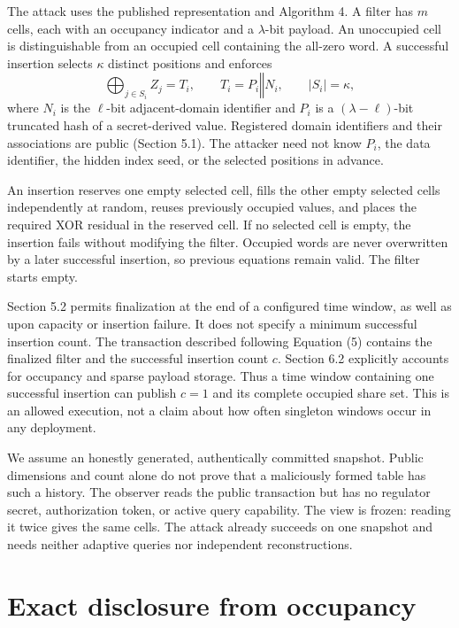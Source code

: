 \documentclass[11pt]{article}
\begin{document}
The attack uses the published representation and Algorithm 4. A filter has
$m$ cells, each with an occupancy indicator and a $\lambda$-bit payload. An
unoccupied cell is distinguishable from an occupied cell containing the all-zero
word. A successful insertion selects $\kappa$ distinct positions and enforces
\begin{equation}
  \bigoplus_{j\in S_i} Z_j = T_i,
  \qquad T_i=P_i\mathbin\Vert N_i, \qquad |S_i|=\kappa,
  \label{eq:row}
\end{equation}
where $N_i$ is the $\ell$-bit adjacent-domain identifier and $P_i$ is a
$(\lambda-\ell)$-bit truncated hash of a secret-derived value. Registered
domain identifiers and their associations are public (Section 5.1).
The attacker need not know $P_i$, the data identifier, the hidden index seed,
or the selected positions in advance.

An insertion reserves one empty selected cell, fills the other empty selected
cells independently at random, reuses previously occupied values, and places
the required XOR residual in the reserved cell. If no selected cell is empty,
the insertion fails without modifying the filter. Occupied words are never
overwritten by a later successful insertion, so previous equations remain
valid. The filter starts empty.

Section 5.2 permits finalization at the end of a configured time window, as
well as upon capacity or insertion failure. It does not specify a minimum
successful insertion count. The transaction described following Equation (5)
contains the finalized filter and the successful insertion count $c$.
Section 6.2 explicitly accounts for occupancy and sparse payload storage.
Thus a time window containing one successful insertion can publish $c=1$ and
its complete occupied share set. This is an allowed execution, not a claim
about how often singleton windows occur in any deployment.

We assume an honestly generated, authentically committed snapshot. Public
dimensions and count alone do not prove that a maliciously formed table has
such a history. The observer reads the public transaction but has no regulator
secret, authorization token, or active query capability. The view is frozen:
reading it twice gives the same cells. The attack already succeeds on one
snapshot and needs neither adaptive queries nor independent reconstructions.

\section{Exact disclosure from occupancy}
\end{document}
